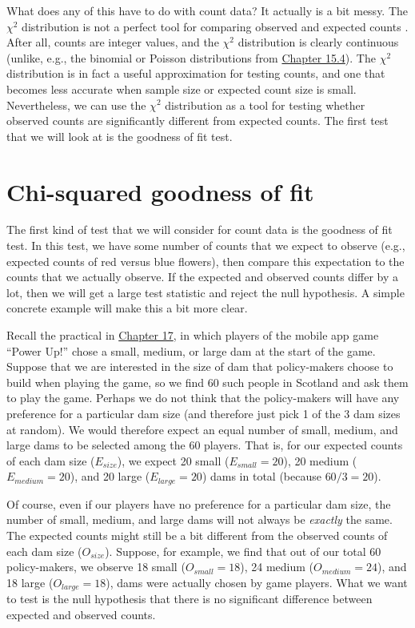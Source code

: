 \documentclass[
  openany]{scrbook}
\begin{document}
What does any of this have to do with count data? It actually is a bit messy.
The \(\chi^{2}\) distribution is not a perfect tool for comparing observed and expected counts \citep{Sokal1995}.
After all, counts are integer values, and the \(\chi^{2}\) distribution is clearly continuous (unlike, e.g., the binomial or Poisson distributions from \protect\hyperlink{ux5cux23probability-distributions}{Chapter 15.4}).
The \(\chi^{2}\) distribution is in fact a useful approximation for testing counts, and one that becomes less accurate when sample size \citep{Slakter1968} or expected count size \citep{Tate1973} is small.
Nevertheless, we can use the \(\chi^{2}\) distribution as a tool for testing whether observed counts are significantly different from expected counts.
The first test that we will look at is the goodness of fit test.

\hypertarget{chi-squared-goodness-of-fit}{%
\section{Chi-squared goodness of fit}\label{chi-squared-goodness-of-fit}}

The first kind of test that we will consider for count data is the goodness of fit test.
In this test, we have some number of counts that we expect to observe (e.g., expected counts of red versus blue flowers), then compare this expectation to the counts that we actually observe.
If the expected and observed counts differ by a lot, then we will get a large test statistic and reject the null hypothesis.
A simple concrete example will make this a bit more clear.

Recall the practical in \protect\hyperlink{Chapter_17}{Chapter 17}, in which players of the mobile app game ``Power Up!'' chose a small, medium, or large dam at the start of the game.
Suppose that we are interested in the size of dam that policy-makers choose to build when playing the game, so we find 60 such people in Scotland and ask them to play the game.
Perhaps we do not think that the policy-makers will have any preference for a particular dam size (and therefore just pick 1 of the 3 dam sizes at random).
We would therefore expect an equal number of small, medium, and large dams to be selected among the 60 players.
That is, for our expected counts of each dam size (\(E_{size}\)), we expect 20 small (\(E_{small} = 20\)), 20 medium (\(E_{medium} = 20\)), and 20 large (\(E_{large} = 20\)) dams in total (because \(60/3 = 20\)).

Of course, even if our players have no preference for a particular dam size, the number of small, medium, and large dams will not always be \emph{exactly} the same.
The expected counts might still be a bit different from the observed counts of each dam size (\(O_{size}\)).
Suppose, for example, we find that out of our total 60 policy-makers, we observe 18 small (\(O_{small} = 18\)), 24 medium (\(O_{medium} = 24\)), and 18 large (\(O_{large} = 18\)), dams were actually chosen by game players.
What we want to test is the null hypothesis that there is no significant difference between expected and observed counts.
\end{document}

